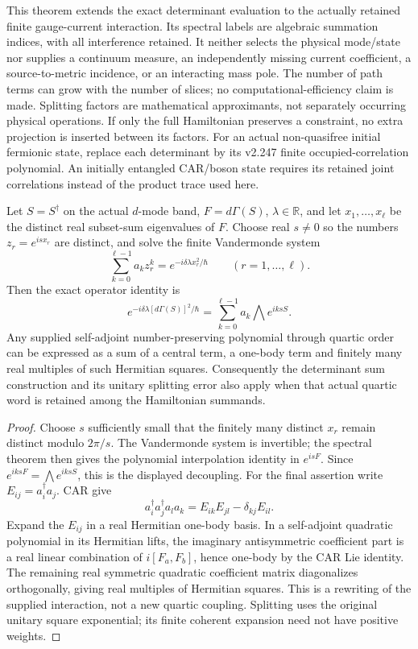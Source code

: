\documentclass[12pt,a4paper]{article}
\begin{document}
This theorem extends the exact determinant evaluation to the actually
retained finite gauge-current interaction. Its spectral labels are algebraic
summation indices, with all interference retained. It neither selects the
physical mode/state nor supplies a continuum measure, an independently
missing current coefficient, a source-to-metric incidence, or an interacting
mass pole. The number of path terms can grow with the number of slices;
no computational-efficiency claim is made. Splitting factors are
mathematical approximants, not separately occurring physical operations.
If only the full Hamiltonian preserves a constraint, no extra projection
is inserted between its factors. For an actual non-quasifree
initial fermionic state, replace each determinant by its v2.247 finite
occupied-correlation polynomial. An initially entangled CAR/boson state
requires its retained joint correlations instead of the product trace used
here.

\begin{lemma}
\label{p4:lem:v248-quartic-discrete-decoupling}
Let $S=S^\dagger$ on the actual $d$-mode band, $F=d\Gamma(S)$,
$\lambda\in\mathbb R$, and let
$x_1,\ldots,x_\ell$ be the distinct real subset-sum eigenvalues of $F$.
Choose real $s\ne0$ so the numbers $z_r=e^{isx_r}$ are distinct, and
solve the finite Vandermonde system
\[
 \sum_{k=0}^{\ell-1}a_k z_r^k=e^{-i\delta\lambda x_r^2/\hbar}
 \qquad(r=1,\ldots,\ell).
\]
Then the exact operator identity is
\[
 \boxed{e^{-i\delta\lambda[d\Gamma(S)]^2/\hbar}
       =\sum_{k=0}^{\ell-1}a_k\bigwedge e^{iksS}.}
\]
Any supplied self-adjoint number-preserving polynomial through quartic order
can be expressed as a sum of a central term, a one-body term and finitely
many real multiples of such Hermitian squares. Consequently the determinant
sum construction and its unitary splitting error also apply when that
actual quartic word is retained among the Hamiltonian summands.
\end{lemma}
\begin{proof}
Choose $s$ sufficiently small that the finitely many distinct $x_r$ remain
distinct modulo $2\pi/s$. The Vandermonde system is invertible; the spectral
theorem then gives the polynomial interpolation identity in $e^{isF}$.
Since $e^{iksF}=\bigwedge e^{iksS}$, this is the displayed decoupling.
For the final assertion write $E_{ij}=a_i^\dagger a_j$. CAR give
\[
 a_i^\dagger a_j^\dagger a_l a_k=E_{ik}E_{jl}-\delta_{kj}E_{il}.
\]
Expand the $E_{ij}$ in a real Hermitian one-body basis. In a self-adjoint
quadratic polynomial in its Hermitian lifts, the imaginary antisymmetric
coefficient part is a real linear combination of $i[F_a,F_b]$, hence
one-body by the CAR Lie identity. The remaining real symmetric quadratic
coefficient matrix diagonalizes orthogonally, giving real multiples of
Hermitian squares. This is a rewriting of the supplied interaction, not a
new quartic coupling. Splitting uses the original unitary square
exponential; its finite coherent expansion need not have positive weights.
\end{proof}
\end{document}
